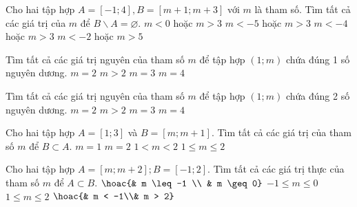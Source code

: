 \begin{ex}
	Cho hai tập hợp $A=[-1 ; 4], B=[m+1 ; m+3]$ với $m$ là tham số. Tìm tất cả các giá trị của $m$ để $B \backslash A=\varnothing$.
	\choice
	{$m<0$ hoặc $m>3$}
	{$m<-5$ hoặc $m>3$}
	{\True $m<-4$ hoặc $m>3$}
	{$m<-2$ hoặc $m>5$}
\end{ex}

\begin{ex}%
	Tìm tất cả các giá trị nguyên của tham số $m$ để tập hợp $\left(1;m\right)$ chứa đúng 1 số nguyên dương.
	\choice
	{$m=2$}
	{$m>2$}
	{\True$m=3$}
	{$m=4$}
\end{ex}
\begin{ex}%
	Tìm tất cả các giá trị nguyên của tham số  $m$ để tập hợp $\left(1;m\right)$ chứa đúng 2 số nguyên dương.
	\choice
	{$m=2$}
	{$m>2$}
	{$m=3$}
	{\True $m=4$}
\end{ex}

\begin{ex}%
	Cho hai tập hợp $A = \left[ {1;3} \right]$ và $B = \left[ {m;m + 1} \right]$. Tìm tất cả các giá trị của tham số $ m $ để $B \subset A$.
	\choice
	{$ m=1 $}
	{$ m=2 $}
	{$ 1<m<2 $}
	{\True $ 1 \leqslant m \leqslant 2 $}
\end{ex}

\begin{ex}%
	Cho hai tập hợp $A = \left[ m; m + 2\right]; B =\left[ -1; 2\right]$. Tìm tất cả các giá trị thực của tham số $m$ để $A \subset B$.
	\choice
	{$\hoac{& m \leq -1 \\ & m \geq 0}$}
	{\True $-1 \leq m \leq 0$}
	{$1 \leq m \leq 2$}
	{$\hoac{& m < -1\\& m > 2}$}
\end{ex}

